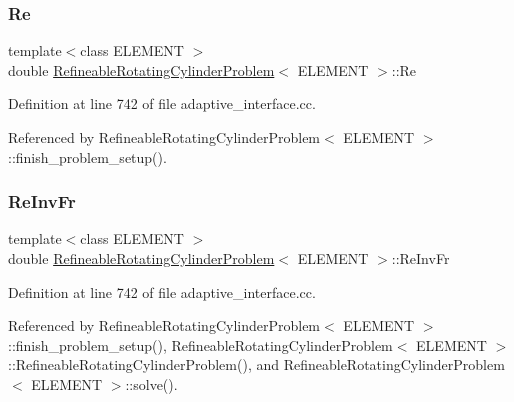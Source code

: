 \mbox{\label{classRefineableRotatingCylinderProblem_a3a7fe3dd801eb1ef71dcf8e4c6a237ef}} 
\subsubsection{\texorpdfstring{Re}{Re}}
{\footnotesize\ttfamily template$<$class E\+L\+E\+M\+E\+NT $>$ \\
double \hyperlink{classRefineableRotatingCylinderProblem}{Refineable\+Rotating\+Cylinder\+Problem}$<$ E\+L\+E\+M\+E\+NT $>$\+::Re}



Definition at line 742 of file adaptive\+\_\+interface.\+cc.



Referenced by Refineable\+Rotating\+Cylinder\+Problem$<$ E\+L\+E\+M\+E\+N\+T $>$\+::finish\+\_\+problem\+\_\+setup().

\mbox{\label{classRefineableRotatingCylinderProblem_acf70c93c4b4db46c1809f6b9f68214ee}} 
\subsubsection{\texorpdfstring{Re\+Inv\+Fr}{ReInvFr}}
{\footnotesize\ttfamily template$<$class E\+L\+E\+M\+E\+NT $>$ \\
double \hyperlink{classRefineableRotatingCylinderProblem}{Refineable\+Rotating\+Cylinder\+Problem}$<$ E\+L\+E\+M\+E\+NT $>$\+::Re\+Inv\+Fr}



Definition at line 742 of file adaptive\+\_\+interface.\+cc.



Referenced by Refineable\+Rotating\+Cylinder\+Problem$<$ E\+L\+E\+M\+E\+N\+T $>$\+::finish\+\_\+problem\+\_\+setup(), Refineable\+Rotating\+Cylinder\+Problem$<$ E\+L\+E\+M\+E\+N\+T $>$\+::\+Refineable\+Rotating\+Cylinder\+Problem(), and Refineable\+Rotating\+Cylinder\+Problem$<$ E\+L\+E\+M\+E\+N\+T $>$\+::solve().

